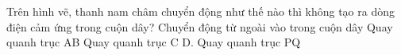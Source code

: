 
\begin{ex}
	Trên hình vẽ, thanh nam châm chuyển động như thế nào thì không tạo ra dòng điện cảm ứng trong cuộn dây?
	\choice
	{Chuyển động từ ngoài vào trong cuộn dây}
	{Quay quanh trục AB}
	{Quay quanh trục C}
	{\True D. Quay quanh trục PQ}
	\loigiai{}
\end{ex}















